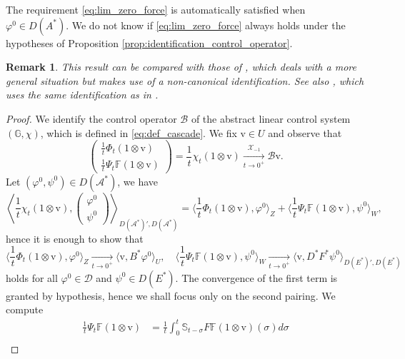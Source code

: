 \documentclass[10pt]{article}
\newtheorem{Remark}[Theorem]{Remark}
\begin{document}
The requirement \eqref{eq:lim_zero_force} is automatically satisfied when $\varphi^0 \in D(A^*)$. We do not know if \eqref{eq:lim_zero_force} always holds under the hypotheses of Proposition \ref{prop:identification_control_operator}.
\begin{Remark}
This result can be compared with those of \cite[\S 7]{weiss_feedback}, which deals with a more general situation but makes use of a non-canonical identification. See also \cite[Lemma 5.1]{curtain_weiss_dynamic}, which uses the same identification  as in  \cite{weiss_feedback}.
\end{Remark}
\begin{proof}
We identify the control operator  $\mathcal{B}$ of the abstract linear control system $(\mathbb{G},\chi)$, which is defined in \eqref{eq:def_cascade}. We fix $\mathrm{v} \in U$ and observe that 
\[
\left( \begin{array}{c}
\frac{1}{t} \Phi_t (1 \otimes \mathrm{v}) \\
\frac{1}{t} \Psi_t \mathbb{F} (1 \otimes \mathrm{v})
\end{array}\right)  = \frac{1}{t} \chi_t(1 \otimes \mathrm{v}) \xrightarrow[t \to 0^+]{\mathcal{X}_{-1}} \mathcal{B} \mathrm{v}.
\]
Let $(\varphi^0,\psi^0) \in D(\mathcal{A}^*)$, we have
\[
\left\langle \frac{1}{t} \chi_t(1 \otimes \mathrm{v}) , \left( \begin{array}{c}
\varphi^0\\ \psi^0
\end{array}\right) \right\rangle_{D(\mathcal{A}^*)',D(\mathcal{A}^*)} = \langle \frac{1}{t} \Phi_t (1 \otimes \mathrm{v}) , \varphi^0\rangle_Z + \langle \frac{1}{t} \Psi_t \mathbb{F} (1 \otimes \mathrm{v}) , \psi^0\rangle_W,
\]
hence it is enough to show that 
\begin{equation}\label{eq:conv_indentification}
\langle \frac{1}{t} \Phi_t (1 \otimes \mathrm{v}) , \varphi^0\rangle_Z \xrightarrow[t \to 0^+]{} \langle \mathrm{v}, B^* \varphi^0\rangle_U ,\quad \langle \frac{1}{t} \Psi_t \mathbb{F} (1 \otimes \mathrm{v}) , \psi^0\rangle_W \xrightarrow[t \to 0^+]{} \langle \mathrm{v} , D^*F^*\psi^0\rangle_{D(E^*)',D(E^*)}
\end{equation}
holds for all $\varphi^0 \in \mathcal{D}$ and $\psi^0 \in D(E^*)$. The convergence of the first term is granted by hypothesis, hence we shall focus only on the second pairing. We compute 
\begin{align*}
\frac{1}{t} \Psi_t \mathbb{F} (1 \otimes \mathrm{v}) &= \frac{1}{t} \int_0^t \mathbb{S}_{t-\sigma} F \mathbb{F}(1\otimes \mathrm{v})(\sigma)d\sigma \\

\end{align*}
\end{proof}
\end{document}
